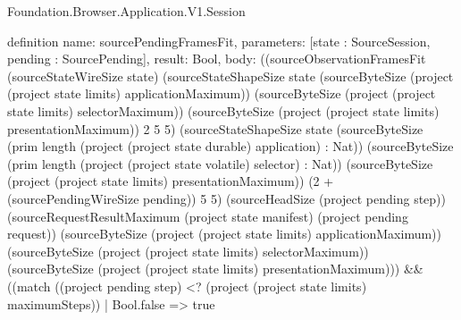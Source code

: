 \begin{lexlean}{Foundation.Browser.Application.V1.Session}
\begin{semanticmodule}
definition{
  name: sourcePendingFramesFit,
  parameters: [state : SourceSession, pending : SourcePending],
  result: Bool,
  body: ((sourceObservationFramesFit (sourceStateWireSize state) (sourceStateShapeSize state (sourceByteSize (project (project state limits) applicationMaximum)) (sourceByteSize (project (project state limits) selectorMaximum)) (sourceByteSize (project (project state limits) presentationMaximum)) 2 5 5) (sourceStateShapeSize state (sourceByteSize (prim length (project (project state durable) application) : Nat)) (sourceByteSize (prim length (project (project state volatile) selector) : Nat)) (sourceByteSize (project (project state limits) presentationMaximum)) (2 + (sourcePendingWireSize pending)) 5 5) (sourceHeadSize (project pending step)) (sourceRequestResultMaximum (project state manifest) (project pending request)) (sourceByteSize (project (project state limits) applicationMaximum)) (sourceByteSize (project (project state limits) selectorMaximum)) (sourceByteSize (project (project state limits) presentationMaximum))) && ((match ((project pending step) <? (project (project state limits) maximumSteps))
    | Bool.false => true
}
\end{semanticmodule}
\end{lexlean}
